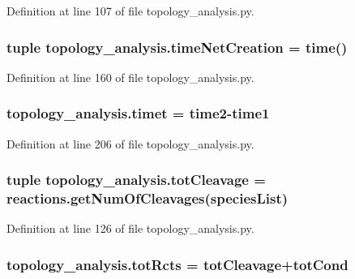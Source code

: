 Definition at line 107 of file topology\-\_\-analysis.\-py.

\hypertarget{a00128_a2f85d448268dd44ad47f66b65bfa45b6}{
\subsubsection[{time\-Net\-Creation}]{\setlength{\rightskip}{0pt plus 5cm}tuple topology\-\_\-analysis.\-time\-Net\-Creation = time()}}\label{a00128_a2f85d448268dd44ad47f66b65bfa45b6}


Definition at line 160 of file topology\-\_\-analysis.\-py.

\hypertarget{a00128_a5b12bbbc66679be171ab082dbaeba90b}{
\subsubsection[{timet}]{\setlength{\rightskip}{0pt plus 5cm}topology\-\_\-analysis.\-timet = {\bf time2}-\/{\bf time1}}}\label{a00128_a5b12bbbc66679be171ab082dbaeba90b}


Definition at line 206 of file topology\-\_\-analysis.\-py.

\hypertarget{a00128_a1e875e49e1f980d461a398fd6a072b0b}{
\subsubsection[{tot\-Cleavage}]{\setlength{\rightskip}{0pt plus 5cm}tuple topology\-\_\-analysis.\-tot\-Cleavage = reactions.\-get\-Num\-Of\-Cleavages({\bf species\-List})}}\label{a00128_a1e875e49e1f980d461a398fd6a072b0b}


Definition at line 126 of file topology\-\_\-analysis.\-py.

\hypertarget{a00128_a059c41eb160321f87ba469fddd20eda7}{
\subsubsection[{tot\-Rcts}]{\setlength{\rightskip}{0pt plus 5cm}topology\-\_\-analysis.\-tot\-Rcts = {\bf tot\-Cleavage}+tot\-Cond}}\label{a00128_a059c41eb160321f87ba469fddd20eda7}


